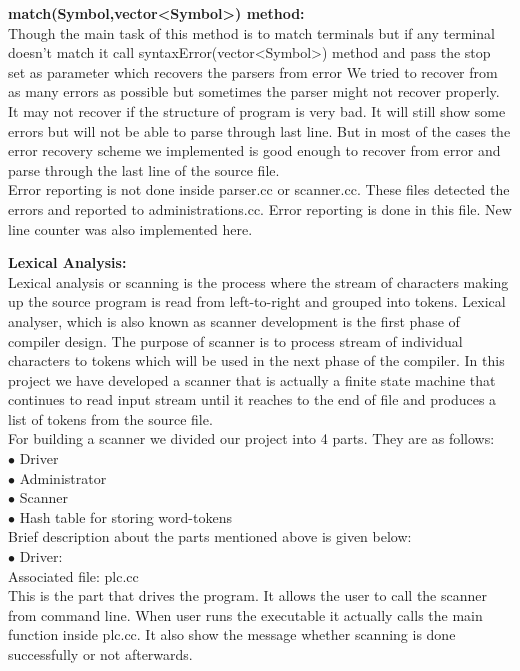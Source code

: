 \documentclass[paper=letter, fontsize=12pt]{scrartcl} %
\begin{document}
{\bf match(Symbol,vector<Symbol>) method:}\\
Though the main task of this method is to match terminals but if any terminal doesn't match it call syntaxError(vector<Symbol>) method and pass the stop set as parameter which recovers the parsers from error		
We tried to recover from as many errors as possible but sometimes the parser might not recover properly. It may not recover if the structure of program is very bad. It will still show some errors but will not be able to parse through last line. But in most of the cases the error recovery scheme we implemented is good enough to recover from error and parse through the last line of the source file.\\

Error reporting is not done inside parser.cc or scanner.cc. These files detected the errors and reported to administrations.cc. Error reporting is done in this file. New line counter was also implemented here.\\

\pagebreak

{\bf {\huge Lexical Analysis:}}\\
Lexical analysis or scanning is the process where the stream of characters making up the source program is read from left-to-right and grouped into tokens. Lexical analyser, which is also known as scanner development is the first phase of compiler design. The purpose of scanner is to process stream of individual characters to tokens which will be used in the next phase of the compiler. In this project we have developed a scanner that is actually a finite state machine that continues to read input stream until it reaches to the end of file and produces a list of tokens from the source file.\\
For building a scanner we divided our project into 4 parts. They are as follows:\\
$\bullet$ Driver\\
$\bullet$ Administrator\\
$\bullet$ Scanner\\
$\bullet$ Hash table for storing word-tokens\\

Brief description about the parts mentioned above is given below:\\
$\bullet$ Driver:\\

Associated file: plc.cc\\
This is the part that drives the program. It allows the user to call the scanner from command line. When user runs the executable it actually calls the main function inside plc.cc. It also show the message whether scanning is done successfully or not afterwards.
\end{document}
